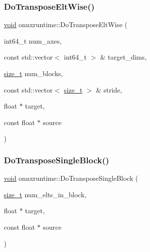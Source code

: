 \mbox{\label{namespaceonnxruntime_ae41610a7f42e9801286c0bec42e82eb1}} 
\subsubsection{\texorpdfstring{Do\+Transpose\+Elt\+Wise()}{DoTransposeEltWise()}}
{\footnotesize\ttfamily \mbox{\hyperlink{mlasi_8h_a88f941d423cb2a819b70a1358982b1a6}{void}} onnxruntime\+::\+Do\+Transpose\+Elt\+Wise (\begin{DoxyParamCaption}\item[{int64\+\_\+t}]{num\+\_\+axes,  }\item[{const std\+::vector$<$ int64\+\_\+t $>$ \&}]{target\+\_\+dims,  }\item[{\mbox{\hyperlink{mlasi_8h_a503efbc1c6e50825320ad909366b78ab}{size\+\_\+t}}}]{num\+\_\+blocks,  }\item[{const std\+::vector$<$ \mbox{\hyperlink{mlasi_8h_a503efbc1c6e50825320ad909366b78ab}{size\+\_\+t}} $>$ \&}]{stride,  }\item[{float $\ast$}]{target,  }\item[{const float $\ast$}]{source }\end{DoxyParamCaption})}

\mbox{\label{namespaceonnxruntime_ae5d554a8dfb6473becd9d8e1aadb8734}} 
\subsubsection{\texorpdfstring{Do\+Transpose\+Single\+Block()}{DoTransposeSingleBlock()}}
{\footnotesize\ttfamily \mbox{\hyperlink{mlasi_8h_a88f941d423cb2a819b70a1358982b1a6}{void}} onnxruntime\+::\+Do\+Transpose\+Single\+Block (\begin{DoxyParamCaption}\item[{\mbox{\hyperlink{mlasi_8h_a503efbc1c6e50825320ad909366b78ab}{size\+\_\+t}}}]{num\+\_\+elts\+\_\+in\+\_\+block,  }\item[{float $\ast$}]{target,  }\item[{const float $\ast$}]{source }\end{DoxyParamCaption})}

